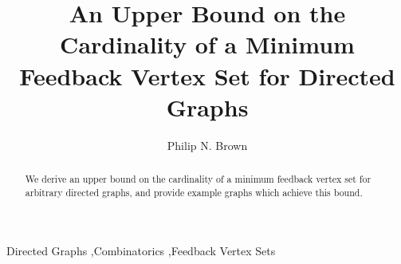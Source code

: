 \documentclass[preprint,12pt]{elsarticle}
\begin{document}
\begin{frontmatter}



\title{An Upper Bound on the Cardinality of a Minimum Feedback Vertex Set for Directed Graphs}


\author{Philip N. Brown%
}


\address{Department of Computer Science\\ University of Colorado Colorado Springs\\ USA 80918}

\begin{abstract}
We derive an upper bound on the cardinality of a minimum feedback vertex set for arbitrary directed graphs, and provide example graphs which achieve this bound.
\end{abstract}



\begin{keyword}
Directed Graphs \sep Combinatorics \sep Feedback Vertex Sets



\end{keyword}

\end{frontmatter}
\end{document}
